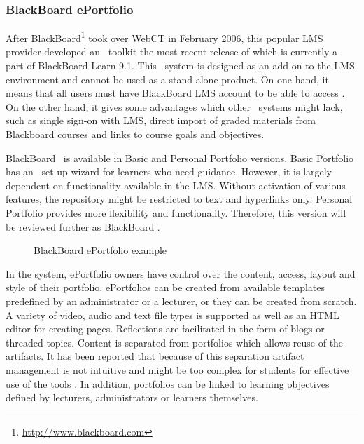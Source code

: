 \subsubsection{BlackBoard ePortfolio}
After BlackBoard\footnote{\url{http://www.blackboard.com}} took over WebCT in
February 2006, this popular LMS provider developed an \ep~toolkit the most
recent release of which is currently a part of BlackBoard Learn 9.1. This
\ep~system is designed as an add-on to the LMS environment and cannot be used
as a stand-alone product. On one hand, it means that all users must have
BlackBoard LMS account to be able to access \ep. On the other hand, it gives
some advantages which other \ep~systems might lack, such as single sign-on with
LMS, direct import of graded materials from Blackboard courses and links to
course goals and objectives.

BlackBoard \ep~is available in Basic and Personal Portfolio versions. Basic
Portfolio has an \ep~set-up wizard for learners who need guidance. However, it
is largely dependent on functionality available in the LMS. Without activation
of various features, the repository might be restricted to text and hyperlinks
only. Personal Portfolio provides more flexibility and functionality. Therefore,
this version will be reviewed further as BlackBoard \ep.

\begin{figure}[htb]
\centering 
\setlength\fboxsep{0pt}
\setlength\fboxrule{0.5pt}
\fbox{\texttt{[image: CH4-F6-BB]}}
\caption[BlackBoard ePortfolio example]{BlackBoard ePortfolio example
\citep{UniversityofTorontoScarborough2010}}
\label{fig:bbep}
\end{figure}

In the system, ePortfolio owners have control over the content, access, layout
and style of their portfolio. ePortfolios can be created from available
templates predefined by an administrator or a lecturer, or they can be created
from scratch. A variety of video, audio and text file types is supported as well
as an HTML editor for creating pages. Reflections are facilitated in the form of
blogs or threaded topics. Content is separated from portfolios which allows
reuse of the artifacts. It has been reported that because of this separation
artifact management is not intuitive and might be too complex for students for
effective use of the tools \citep{Clark2009}. In addition, portfolios can be
linked to learning objectives defined by lecturers, administrators or learners
themselves.


